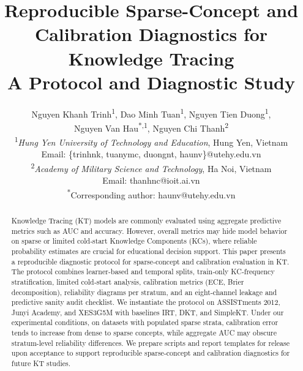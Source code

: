 \documentclass[12pt,a4paper]{jedm}
\begin{document}
\title{\sffamily\bfseries Reproducible Sparse-Concept and Calibration Diagnostics for Knowledge Tracing\\
{\large A Protocol and Diagnostic Study}}

\author{
\sffamily Nguyen Khanh Trinh\textsuperscript{1}, Dao Minh Tuan\textsuperscript{1}, Nguyen Tien Duong\textsuperscript{1}, \\
\sffamily Nguyen Van Hau\textsuperscript{*,1}, Nguyen Chi Thanh\textsuperscript{2}\\[8pt]
\normalsize \textsuperscript{1}\textit{Hung Yen University of Technology and Education}, Hung Yen, Vietnam\\
\normalsize Email: \{trinhnk, tuanymc, duongnt, haunv\}@utehy.edu.vn\\[4pt]
\normalsize \textsuperscript{2}\textit{Academy of Military Science and Technology}, Ha Noi, Vietnam\\
\normalsize Email: thanhnc@ioit.ai.vn\\[8pt]
\normalsize \textsuperscript{*}Corresponding author: haunv@utehy.edu.vn
}
\date{}

\maketitle

\begin{abstract}
Knowledge Tracing (KT) models are commonly evaluated using aggregate predictive metrics such as AUC and accuracy. However, overall metrics may hide model behavior on sparse or limited cold‑start Knowledge Components (KCs), where reliable probability estimates are crucial for educational decision support. This paper presents a reproducible diagnostic protocol for sparse‑concept and calibration evaluation in KT. The protocol combines learner‑based and temporal splits, train‑only KC‑frequency stratification, limited cold‑start analysis, calibration metrics (ECE, Brier decomposition), reliability diagrams per stratum, and an eight‑channel leakage and predictive sanity audit checklist. We instantiate the protocol on ASSISTments 2012, Junyi Academy, and XES3G5M with baselines IRT, DKT, and SimpleKT. Under our experimental conditions, on datasets with populated sparse strata, calibration error tends to increase from dense to sparse concepts, while aggregate AUC may obscure stratum-level reliability differences. We prepare scripts and report templates for release upon acceptance to support reproducible sparse‑concept and calibration diagnostics for future KT studies.
\end{abstract}
\end{document}
